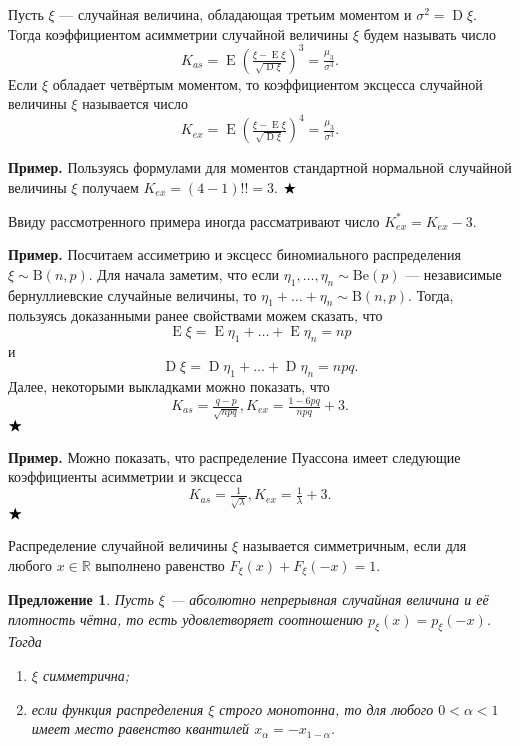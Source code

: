 \documentclass[12pt]{article}
\newtheorem{proposition}[theorem]{Предложение}
\numberwithin{theorem}{section}
\theoremstyle{definition}
\newenvironment{example}{\indent \textbf{Пример.}}{$ \hfill \bigstar $}
\newcommand{\defin}[2]{\hypertarget{#2}{{\color{red} #1}}}
\newcommand{\RR}{\mathbb{R}}
\newcommand{\expect}{\operatorname{E}}
\newcommand{\disp}{\operatorname{D}}
\begin{document}
	Пусть $ \xi $ --- случайная величина, обладающая третьим моментом и $ \sigma^2 = \disp\xi $.
	Тогда \defin{коэффициентом асимметрии случайной величины $ \xi $}{asimmetry} будем называть 
	число 
	$$ K_{as} = \expect\left(\tfrac{\xi - \expect\xi}{\sqrt{\disp\xi}}\right)^3 = \tfrac{\mu_3}{\sigma^3}. $$
	Если $ \xi $ обладает четвёртым моментом, то \defin{коэффициентом эксцесса случайной величины $ \xi $}{excess} 
	называется число
	$$ K_{ex} = \expect\left(\tfrac{\xi - \expect\xi}{\sqrt{\disp\xi}}\right)^4 = \tfrac{\mu_3}{\sigma^3}. $$
	
	\begin{example}
		Пользуясь формулами для моментов стандартной нормальной случайной величины $ \xi $
		получаем $ K_{ex} = (4 - 1)!! = 3 $.
	\end{example}
	
	Ввиду рассмотренного примера иногда рассматривают число $ K_{ex}^* = K_{ex} - 3 $.
	
	\begin{example}
		Посчитаем ассиметрию и эксцесс биномиального распределения $ \xi \sim \mathrm{B}(n, p) $.
		Для начала заметим, что если $ \eta_1, \ldots, \eta_n \sim \mathrm{Be}(p) $ --- 
		независимые бернуллиевские случайные величины, то $ \eta_1 + \ldots + \eta_n \sim \mathrm{B}(n, p) $.
		Тогда, пользуясь доказанными ранее свойствами можем сказать, что 
		$$ \expect\xi = \expect\eta_1 + \ldots + \expect\eta_n = np $$
		и 
		$$ \disp\xi = \disp\eta_1 + \ldots + \disp\eta_n = npq. $$
		Далее, некоторыми выкладками
		можно показать, что
		$$ K_{as} = \tfrac{q - p}{\sqrt{npq}}, K_{ex} = \tfrac{1 - 6pq}{npq} + 3. $$
	\end{example}
	
	\begin{example}
		Можно показать, что распределение Пуассона имеет следующие коэффициенты асимметрии и эксцесса
		$$ K_{as} = \tfrac{1}{\sqrt{\lambda}}, K_{ex} = \tfrac{1}{\lambda} + 3. $$
	\end{example}
	
	Распределение случайной величины $ \xi $ называется \defin{симметричным}{symmetric-distribution},
	если для любого $ x \in \RR $ выполнено равенство $ F_\xi(x) + F_\xi(-x) = 1 $.
	
	\begin{proposition}
		Пусть $ \xi $ --- абсолютно непрерывная случайная величина
		и её плотность чётна, то есть удовлетворяет соотношению $ p_\xi(x) = p_\xi(-x) $.
		Тогда
		\begin{enumerate}
			\item $ \xi $ симметрична;
			\item если функция распределения $ \xi $ строго монотонна,
			то для любого $ 0 < \alpha < 1 $ имеет место равенство квантилей $ x_{\alpha} = - x_{1 - \alpha} $.
		\end{enumerate}
	\end{proposition}
	
\end{document}
